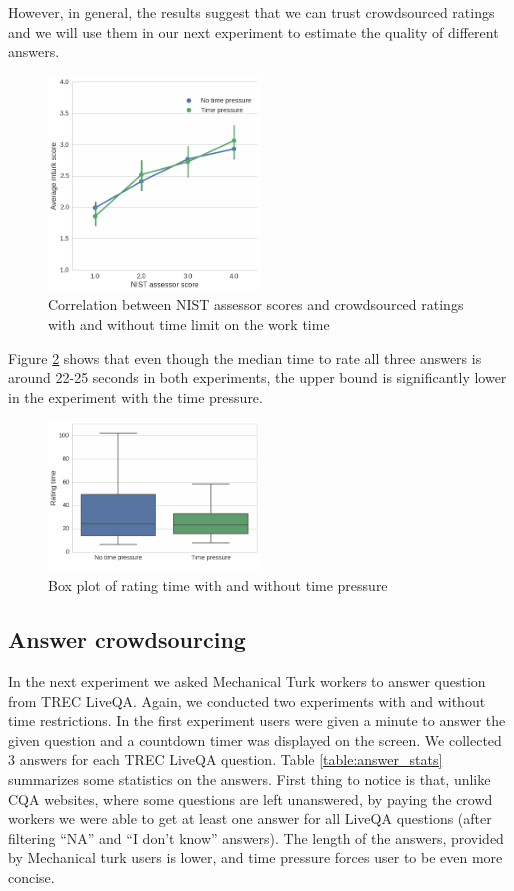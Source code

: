 \documentclass[11pt,letterpaper]{article}
\begin{document}
However, in general, the results suggest that we can trust crowdsourced ratings and we will use them in our next experiment to estimate the quality of different answers.

\begin{figure}[t!]
	\centering
	\includegraphics[width=0.5\textwidth]{img/score_correlation}
	\caption{Correlation between NIST assessor scores and crowdsourced ratings with and without time limit on the work time}
	\label{figure:score_correlation}
\end{figure}
	
Figure \ref{figure:validation_time} shows that even though the median time to rate all three answers is around 22-25 seconds in both experiments, the upper bound is significantly lower in the experiment with the time pressure.
	
\begin{figure}[t!]
	\centering
	\includegraphics[width=0.5\textwidth]{img/validation_time}
	\caption{Box plot of rating time with and without time pressure}
	\label{figure:validation_time}
\end{figure}

\subsection{Answer crowdsourcing}

In the next experiment we asked Mechanical Turk workers to answer question from TREC LiveQA.
Again, we conducted two experiments with and without time restrictions.
In the first experiment users were given a minute to answer the given question and a countdown timer was displayed on the screen.
We collected 3 answers for each TREC LiveQA question.
Table \ref{table:answer_stats} summarizes some statistics on the answers.
First thing to notice is that, unlike CQA websites, where some questions are left unanswered, by paying the crowd workers we were able to get at least one answer for all LiveQA questions (after filtering ``NA'' and ``I don't know'' answers).
The length of the answers, provided by Mechanical turk users is lower, and time pressure forces user to be even more concise.
\end{document}
